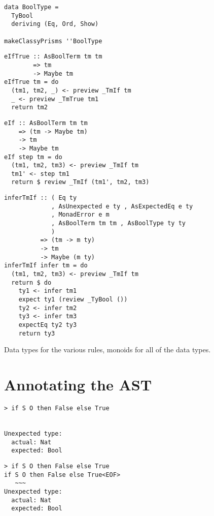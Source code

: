 \documentclass[aspectration=169]{beamer}
\begin{document}
\begin{frame}[fragile]
  \begin{verbatim}
data BoolType =
  TyBool
  deriving (Eq, Ord, Show)

makeClassyPrisms ''BoolType
  \end{verbatim}
\end{frame} 

\begin{frame}[fragile]
  \begin{verbatim}
eIfTrue :: AsBoolTerm tm tm
        => tm
        -> Maybe tm
eIfTrue tm = do
  (tm1, tm2, _) <- preview _TmIf tm
  _ <- preview _TmTrue tm1
  return tm2
  \end{verbatim}
\end{frame} 

\begin{frame}[fragile]
  \begin{verbatim}
eIf :: AsBoolTerm tm tm
    => (tm -> Maybe tm)
    -> tm
    -> Maybe tm
eIf step tm = do
  (tm1, tm2, tm3) <- preview _TmIf tm
  tm1' <- step tm1
  return $ review _TmIf (tm1', tm2, tm3)
  \end{verbatim}
\end{frame} 

\begin{frame}[fragile]
  \begin{verbatim}
inferTmIf :: ( Eq ty
             , AsUnexpected e ty , AsExpectedEq e ty
             , MonadError e m
             , AsBoolTerm tm tm , AsBoolType ty ty
             )
          => (tm -> m ty)
          -> tm
          -> Maybe (m ty)
inferTmIf infer tm = do
  (tm1, tm2, tm3) <- preview _TmIf tm
  return $ do
    ty1 <- infer tm1
    expect ty1 (review _TyBool ())
    ty2 <- infer tm2
    ty3 <- infer tm3
    expectEq ty2 ty3
    return ty3
  \end{verbatim}
\end{frame} 

\begin{frame}[c]
  \begin{center}
   Data types for the various rules, monoids for all of the data types.
  \end{center}
\end{frame}

\section{Annotating the AST}

\begin{frame}[fragile]
  \begin{overprint}
\begin{verbatim}
> if S O then False else True


Unexpected type: 
  actual: Nat
  expected: Bool
\end{verbatim}
\begin{verbatim}
> if S O then False else True
if S O then False else True<EOF>
   ~~~
Unexpected type: 
  actual: Nat
  expected: Bool
\end{verbatim}
  \end{overprint}
\end{frame} 
\end{document}
